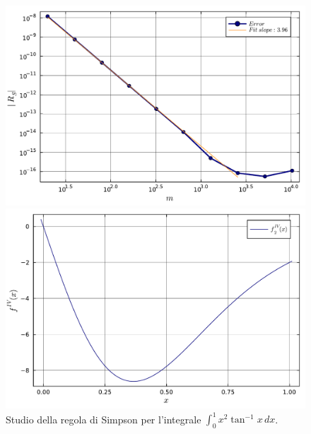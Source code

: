 \documentclass[letterpaper, 12pt]{article}
\numberwithin{equation}{section}    %
\begin{document}
\begin{figure}[!ht]
    \centering
    \begin{minipage}[b]{0.47\textwidth}
        \includegraphics[width=\textwidth]{5142.pdf}
    \end{minipage}
    \hspace{0.5cm}
    \begin{minipage}[b]{0.47\textwidth}
        \includegraphics[width=\textwidth]{5142_2.pdf}
    \end{minipage}
    \caption{Studio della regola di Simpson per l'integrale $\int_0^1 x^2 \tan^{-1}x\, dx$.}
    \label{fig:es5_1_4_2}
\end{figure}
\end{document}
